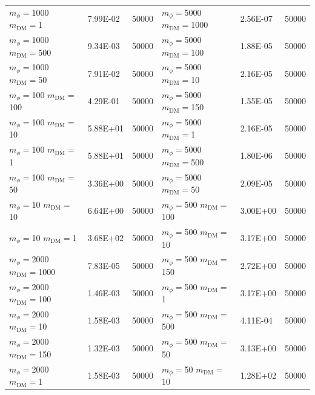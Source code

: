 \begin{table}[]
\begin{tabular}{lll||lll}
$m_\phi=$1000 $m_\textrm{DM}=$1     & 7.99E-02     & 50000                  &  $m_\phi=$5000 $m_\textrm{DM}=$1000  & 2.56E-07     & 50000                  \\ 
$m_\phi=$1000 $m_\textrm{DM}=$500   & 9.34E-03     & 50000                  &  $m_\phi=$5000 $m_\textrm{DM}=$100   & 1.88E-05     & 50000                  \\ 
$m_\phi=$1000 $m_\textrm{DM}=$50    & 7.91E-02     & 50000                  &  $m_\phi=$5000 $m_\textrm{DM}=$10    & 2.16E-05     & 50000                  \\ 
$m_\phi=$100 $m_\textrm{DM}=$100    & 4.29E-01     & 50000                  &  $m_\phi=$5000 $m_\textrm{DM}=$150   & 1.55E-05     & 50000                  \\ 
$m_\phi=$100 $m_\textrm{DM}=$10     & 5.88E+01     & 50000                  &  $m_\phi=$5000 $m_\textrm{DM}=$1     & 2.16E-05     & 50000                  \\ 
$m_\phi=$100 $m_\textrm{DM}=$1      & 5.88E+01     & 50000                  &  $m_\phi=$5000 $m_\textrm{DM}=$500   & 1.80E-06     & 50000                  \\ 
$m_\phi=$100 $m_\textrm{DM}=$50     & 3.36E+00     & 50000                  &  $m_\phi=$5000 $m_\textrm{DM}=$50    & 2.09E-05     & 50000                  \\ 
$m_\phi=$10 $m_\textrm{DM}=$10      & 6.64E+00     & 50000                  &  $m_\phi=$500 $m_\textrm{DM}=$100    & 3.00E+00     & 50000                  \\ 
$m_\phi=$10 $m_\textrm{DM}=$1       & 3.68E+02     & 50000                  &  $m_\phi=$500 $m_\textrm{DM}=$10     & 3.17E+00     & 50000                  \\ 
$m_\phi=$2000 $m_\textrm{DM}=$1000  & 7.83E-05     & 50000                  &  $m_\phi=$500 $m_\textrm{DM}=$150    & 2.72E+00     & 50000                  \\ 
$m_\phi=$2000 $m_\textrm{DM}=$100   & 1.46E-03     & 50000                  &  $m_\phi=$500 $m_\textrm{DM}=$1      & 3.17E+00     & 50000                  \\ 
$m_\phi=$2000 $m_\textrm{DM}=$10    & 1.58E-03     & 50000                  &  $m_\phi=$500 $m_\textrm{DM}=$500    & 4.11E-04     & 50000                  \\ 
$m_\phi=$2000 $m_\textrm{DM}=$150   & 1.32E-03     & 50000                  &  $m_\phi=$500 $m_\textrm{DM}=$50     & 3.13E+00     & 50000                  \\ 
$m_\phi=$2000 $m_\textrm{DM}=$1     & 1.58E-03     & 50000                  &  $m_\phi=$50 $m_\textrm{DM}=$10      & 1.28E+02     & 50000                  \\ 

\end{tabular}
\end{table}
